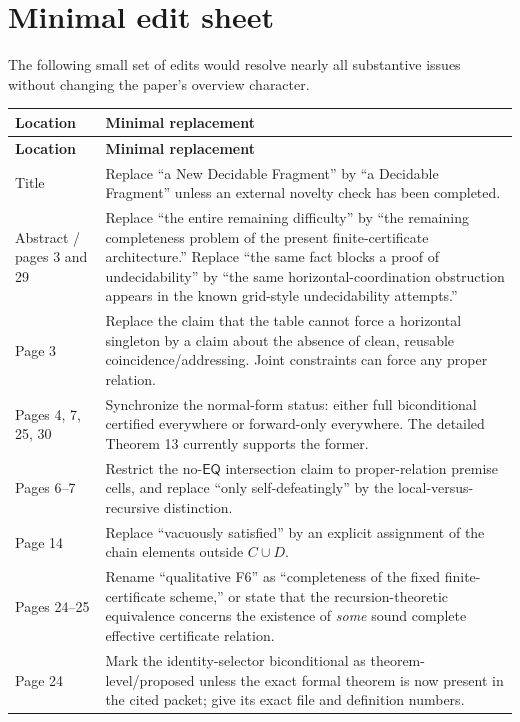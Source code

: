 \documentclass[11pt]{article}
\newcommand{\EQ}{\ensuremath{\mathsf{EQ}}}
\begin{document}
\section{Minimal edit sheet}

The following small set of edits would resolve nearly all substantive issues without changing the paper's overview character.

\begin{longtable}{@{}p{}p{}@{}}
\toprule
\textbf{Location} & \textbf{Minimal replacement} \\
\midrule
\endfirsthead
\toprule
\textbf{Location} & \textbf{Minimal replacement} \\
\midrule
\endhead
Title & Replace ``a New Decidable Fragment'' by ``a Decidable Fragment'' unless an external novelty check has been completed. \\
Abstract / pages 3 and 29 & Replace ``the entire remaining difficulty'' by ``the remaining completeness problem of the present finite-certificate architecture.'' Replace ``the same fact blocks a proof of undecidability'' by ``the same horizontal-coordination obstruction appears in the known grid-style undecidability attempts.'' \\
Page 3 & Replace the claim that the table cannot force a horizontal singleton by a claim about the absence of clean, reusable coincidence/addressing. Joint constraints can force any proper relation. \\
Pages 4, 7, 25, 30 & Synchronize the normal-form status: either full biconditional certified everywhere or forward-only everywhere. The detailed Theorem 13 currently supports the former. \\
Pages 6--7 & Restrict the no-\(\EQ\) intersection claim to proper-relation premise cells, and replace ``only self-defeatingly'' by the local-versus-recursive distinction. \\
Page 14 & Replace ``vacuously satisfied'' by an explicit assignment of the chain elements outside \(C\cup D\). \\
Pages 24--25 & Rename ``qualitative F6'' as ``completeness of the fixed finite-certificate scheme,'' or state that the recursion-theoretic equivalence concerns the existence of \emph{some} sound complete effective certificate relation. \\
Page 24 & Mark the identity-selector biconditional as theorem-level/proposed unless the exact formal theorem is now present in the cited packet; give its exact file and definition numbers. \\

\end{longtable}
\end{document}
